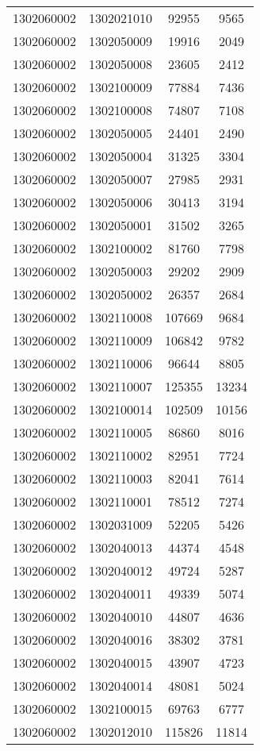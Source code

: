 \begin{longtable}[h]{llcc}
		1302060002 & 1302021010 & 92955 & 9565\\
		1302060002 & 1302050009 & 19916 & 2049\\
		1302060002 & 1302050008 & 23605 & 2412\\
		1302060002 & 1302100009 & 77884 & 7436\\
		1302060002 & 1302100008 & 74807 & 7108\\
		1302060002 & 1302050005 & 24401 & 2490\\
		1302060002 & 1302050004 & 31325 & 3304\\
		1302060002 & 1302050007 & 27985 & 2931\\
		1302060002 & 1302050006 & 30413 & 3194\\
		1302060002 & 1302050001 & 31502 & 3265\\
		1302060002 & 1302100002 & 81760 & 7798\\
		1302060002 & 1302050003 & 29202 & 2909\\
		1302060002 & 1302050002 & 26357 & 2684\\
		1302060002 & 1302110008 & 107669 & 9684\\
		1302060002 & 1302110009 & 106842 & 9782\\
		1302060002 & 1302110006 & 96644 & 8805\\
		1302060002 & 1302110007 & 125355 & 13234\\
		1302060002 & 1302100014 & 102509 & 10156\\
		1302060002 & 1302110005 & 86860 & 8016\\
		1302060002 & 1302110002 & 82951 & 7724\\
		1302060002 & 1302110003 & 82041 & 7614\\
		1302060002 & 1302110001 & 78512 & 7274\\
		1302060002 & 1302031009 & 52205 & 5426\\
		1302060002 & 1302040013 & 44374 & 4548\\
		1302060002 & 1302040012 & 49724 & 5287\\
		1302060002 & 1302040011 & 49339 & 5074\\
		1302060002 & 1302040010 & 44807 & 4636\\
		1302060002 & 1302040016 & 38302 & 3781\\
		1302060002 & 1302040015 & 43907 & 4723\\
		1302060002 & 1302040014 & 48081 & 5024\\
		1302060002 & 1302100015 & 69763 & 6777\\
		1302060002 & 1302012010 & 115826 & 11814\\

\end{longtable}

